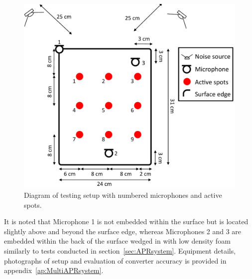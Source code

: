 \begin{figure} %
\begin{minipage}[b]{1.0\linewidth}
  \centering
  \DIFdelbeginFL %
\DIFdelendFL \DIFaddbeginFL \centerline{\includegraphics[width=12cm]{MultiAPRsystem2.pdf}}
\DIFaddendFL \end{minipage}
\caption{Diagram of testing setup with numbered microphones and active spots.}
\label{fig:MultiAPRsystem.pdf}
\end{figure}

It is noted that Microphone 1 is not embedded within the surface but is located slightly above and beyond the surface edge, whereas Microphones 2 and 3 are embedded within the back of the surface wedged in with low density foam similarly to tests conducted in section~\ref{sec:APRsystem}. Equipment details, photographs of setup and evaluation of converter accuracy is provided in appendix~\ref{ap:MultiAPRsystem}.

